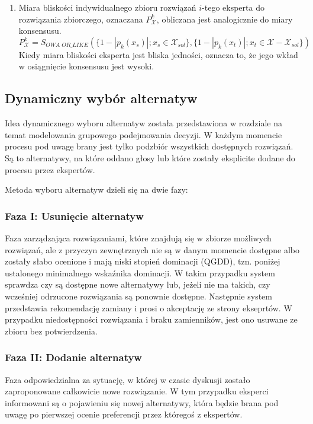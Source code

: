 \begin{enumerate}
  \item Miara bliskości indywidualnego zbioru rozwiązań $i$-tego eksperta do
  rozwiązania zbiorczego, oznaczana $P^k_{\mathcal{X}}$, obliczana jest
  analogicznie do miary konsensusu.
  \begin{equation}
  P^k_{\mathcal{X}} = S_{OWA \; OR\_LIKE}(\{ 1 - |p_k(x_s)|; x_s \in
  \mathcal{X}_{sol}\}, \{ 1 - |p_k(x_t)|; x_t \in \mathcal{X} -
  \mathcal{X}_{sol} \})
  \end{equation}
  Kiedy miara bliskości eksperta jest bliska jedności, oznacza to, że jego wkład
  w osiągnięcie konsensusu jest wysoki.
\end{enumerate}

\subsection{Dynamiczny wybór alternatyw}
Idea dynamicznego wyboru alternatyw została przedstawiona w rozdziale na temat
modelowania grupowego podejmowania decyzji. W każdym momencie procesu pod uwagę
brany jest tylko podzbiór wszystkich dostępnych rozwiązań. Są to alternatywy, na
które oddano głosy lub które zostały eksplicite dodane do procesu przez
ekspertów.

Metoda wyboru alternatyw dzieli się na dwie fazy:
  \subsubsection{Faza I: Usunięcie alternatyw} 
  Faza zarządzająca rozwiązaniami, które znajdują się w zbiorze możliwych
  rozwiązań, ale z przyczyn zewnętrznych nie są w danym momencie dostępne albo
  zostały słabo ocenione i mają niski stopień dominacji (QGDD), tzn. poniżej
  ustalonego minimalnego wskaźnika dominacji. W takim przypadku system sprawdza
  czy są dostępne nowe alternatywy lub, jeżeli nie ma takich, czy wcześniej
  odrzucone rozwiązania są ponownie dostępne. Następnie system przedstawia
  rekomendację zamiany i prosi o akceptację ze strony ekseprtów. W przypadku
  niedostępności rozwiązania i braku zamienników, jest ono usuwane ze zbioru bez
  potwierdzenia.
  
  \subsubsection{Faza II: Dodanie alternatyw}
  Faza odpowiedzialna za sytuację, w której w czasie dyskusji zostało
  zaproponowane całkowicie nowe rozwiązanie. W tym przypadku eksperci
  informowani są o pojawieniu się nowej alternatywy, która będzie brana pod
  uwagę po pierwszej ocenie preferencji przez któregoś z ekspertów.

